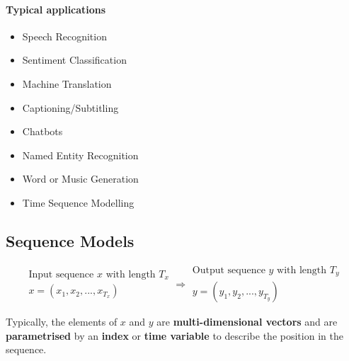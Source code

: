 \documentclass[11pt]{article}
\begin{document}
\paragraph{Typical applications}
\begin{itemize}
	\item Speech Recognition
	\item Sentiment Classification
	\item Machine Translation
	\item Captioning/Subtitling
	\item Chatbots
	\item Named Entity Recognition
	\item Word or Music Generation
	\item Time Sequence Modelling
\end{itemize}

\subsection{Sequence Models}
\begin{equation*}
	\begin{matrix}
	\text{Input sequence $x$ with length $T_x$}\\
	x = (x_1,x_2,...,x_{T_x}) 
	\end{matrix}
	\Rightarrow
	\begin{matrix}
	\text{Output sequence $y$ with length $T_y$}\\
	y = (y_1,y_2,...,y_{T_y}) 
	\end{matrix}
\end{equation*}

Typically, the elements of $x$ and $y$ are \textbf{multi-dimensional vectors} and are \textbf{parametrised} by an \textbf{index} or \textbf{time variable} to describe the position in the sequence.
\end{document}
